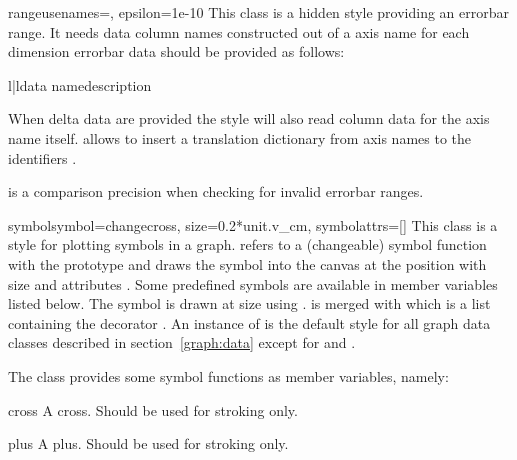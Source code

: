 \begin{classdesc}{range}{usenames={}, epsilon=1e-10} %
  This class is a hidden style providing an errorbar range. It needs
  data column names constructed out of a axis name  for each
  dimension errorbar data should be provided as follows:
  \begin{tableii}{l|l}{}{data name}{description}
  \end{tableii}
  When delta data are provided the style will also read column data
  for the axis name  itself.  allows to insert a
  translation dictionary from axis names to the identifiers .

   is a comparison precision when checking for invalid
  errorbar ranges.
\end{classdesc} %

\begin{classdesc}{symbol}{symbol=changecross, size=0.2*unit.v\_cm, %
                          symbolattrs=[]}
  This class is a style for plotting symbols in a graph.
   refers to a (changeable) symbol function with the
  prototype  and draws
  the symbol into the canvas  at the position  with size  and attributes . Some
  predefined symbols are available in member variables listed below.
  The symbol is drawn at size  using .
   is merged with  which is
  a list containing the decorator . An instance of
   is the default style for all graph data classes
  described in section~\ref{graph:data} except for 
  and .
\end{classdesc}

The class  provides some symbol functions as member
variables, namely:

\begin{memberdesc}{cross}
  A cross. Should be used for stroking only.
\end{memberdesc}

\begin{memberdesc}{plus}
  A plus. Should be used for stroking only.
\end{memberdesc}

